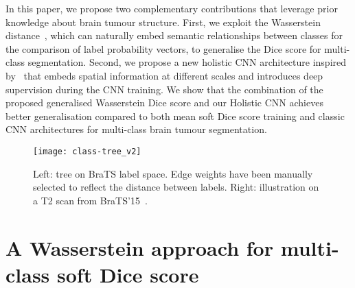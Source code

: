 \documentclass[runningheads,orivec,a4paper]{llncs}
\begin{document}
In this paper, we propose two complementary contributions that leverage
prior knowledge about brain tumour structure. 
%
First, we exploit the Wasserstein distance~\cite{wasserstein_loss,fast_emd}, which can
naturally embed semantic relationships between classes for the
comparison of label probability vectors, to generalise the Dice score
for multi-class segmentation.
%
%
Second, we propose a new holistic CNN architecture inspired
by~\cite{toolnet,hed} that embeds spatial information at different
scales and introduces deep supervision during the CNN training.
%
%
%
We show that the combination of the proposed generalised Wasserstein Dice score and our Holistic CNN achieves better generalisation
compared to both mean soft Dice score training and classic CNN architectures
for multi-class brain tumour segmentation. 
%
\begin{figure}[t!]
	\centering
	\texttt{[image: class-tree\_v2]}
	\caption{Left: tree on BraTS label space. Edge weights have been manually selected to reflect the distance between labels. Right: illustration on a T2 scan from BraTS'15~\cite{brats}.}
	\label{fig:tree}
\end{figure}


\section{A Wasserstein approach for multi-class soft Dice score}
\end{document}
